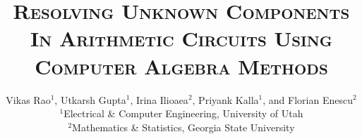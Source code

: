\documentclass[10pt,twocolumn,fleqn]{IEEEtran}
\theoremstyle{definition}
\begin{document}
\setlength{\abovedisplayskip}{0pt}
\setlength{\belowdisplayskip}{0pt}
\setlength{\abovedisplayshortskip}{0pt}
\setlength{\belowdisplayshortskip}{0pt}
\title{\Large\textsc{{R}esolving {U}nknown {C}omponents {I}n {A}rithmetic {C}ircuits {U}sing {C}omputer {A}lgebra {M}ethods}}

\author{Vikas Rao$^1$, Utkarsh Gupta$^1$, Irina Ilioaea$^2$, Priyank Kalla$^1$, and Florian Enescu$^2$\\
$^1$Electrical \& Computer Engineering, University of Utah\\
$^2$Mathematics \& Statistics, Georgia State University \vspace{-0.2in}
}

\maketitle
\thispagestyle{empty}

%
%
%
%
%



\end{document}
